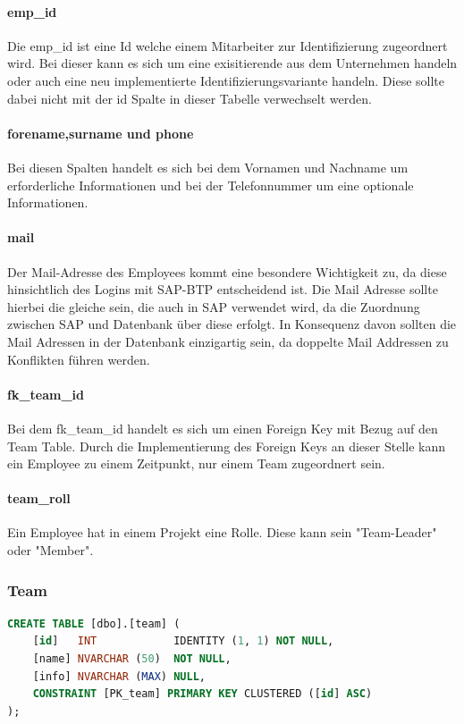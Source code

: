 \documentclass{article}
\begin{document}
\paragraph{emp\_id} Die emp\_id ist eine Id welche einem Mitarbeiter zur Identifizierung
zugeordnert wird. Bei dieser kann es sich um eine exisitierende aus dem
Unternehmen handeln oder auch eine neu implementierte Identifizierungsvariante
handeln. Diese sollte dabei nicht mit der id Spalte in dieser Tabelle
verwechselt werden.

\paragraph{forename,surname und phone} Bei diesen Spalten handelt es sich bei dem Vornamen und Nachname um
erforderliche Informationen und bei der Telefonnummer um eine optionale
Informationen.

\paragraph{mail} Der Mail-Adresse des Employees kommt eine besondere Wichtigkeit zu, da diese
hinsichtlich des Logins mit SAP-BTP entscheidend ist. Die Mail Adresse sollte
hierbei die gleiche sein, die auch in SAP verwendet wird, da die Zuordnung
zwischen SAP und Datenbank über diese erfolgt. In Konsequenz davon sollten die
Mail Adressen in der Datenbank einzigartig sein, da doppelte Mail Addressen zu
Konflikten führen werden.

\paragraph{fk\_team\_id} Bei dem fk\_team\_id handelt es sich um einen Foreign Key mit Bezug auf den Team Table. Durch die Implementierung des Foreign Keys an
dieser Stelle kann ein Employee zu einem Zeitpunkt, nur einem Team zugeordnert sein.

\paragraph{team\_roll}Ein Employee hat in einem Projekt eine Rolle. Diese kann sein "Team-Leader" oder "Member".

\subsubsection{Team}
\begin{lstlisting}[language=Sql, caption= Create Table Statement für Team Table]
    CREATE TABLE [dbo].[team] (
    [id]   INT            IDENTITY (1, 1) NOT NULL,
    [name] NVARCHAR (50)  NOT NULL,
    [info] NVARCHAR (MAX) NULL,
    CONSTRAINT [PK_team] PRIMARY KEY CLUSTERED ([id] ASC)
);

         \end{lstlisting}
\end{document}
